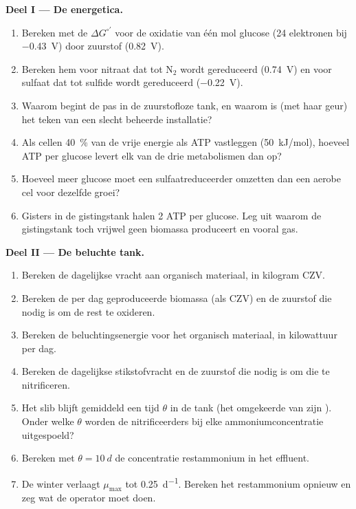 \begin{problem}
\medskip
\noindent\textbf{Deel I --- De energetica.}
\begin{enumerate}
  \item Bereken met de  $\Delta G^{\circ\prime}$
        voor de oxidatie van één mol glucose (24 elektronen bij
        \qty{-0.43}{V}) door zuurstof (\qty{+0.82}{V}).
  \item Bereken hem voor nitraat dat tot $\mathrm{N_2}$ wordt gereduceerd
        (\qty{+0.74}{V}) en voor sulfaat dat tot sulfide wordt gereduceerd
        (\qty{-0.22}{V}).
  \item Waarom begint de  pas in de zuurstofloze tank, en
        waarom is  (met haar geur) het teken van een
        slecht beheerde installatie?
  \item Als cellen \qty{40}{\%} van de vrije energie als ATP vastleggen
        (\qty{50}{kJ/mol}), hoeveel ATP per glucose levert elk van de
        drie metabolismen dan op?
  \item Hoeveel meer glucose moet een sulfaatreduceerder omzetten dan
        een aerobe cel voor dezelfde groei?
  \item Gisters in de gistingstank halen 2 ATP per glucose. Leg uit
        waarom de gistingstank toch vrijwel geen biomassa produceert en
        vooral gas.
\end{enumerate}

\medskip
\noindent\textbf{Deel II --- De beluchte tank.}
\begin{enumerate}[resume]
  \item Bereken de dagelijkse vracht aan organisch materiaal, in
        kilogram CZV.
  \item Bereken de per dag geproduceerde biomassa (als CZV) en de
        zuurstof die nodig is om de rest te oxideren.
  \item Bereken de beluchtingsenergie voor het organisch materiaal, in
        kilowattuur per dag.
  \item Bereken de dagelijkse stikstofvracht en de zuurstof die nodig is
        om die te nitrificeren.
  \item Het slib blijft gemiddeld een tijd $\theta$ in de tank (het
        omgekeerde van zijn ). Onder welke $\theta$
        worden de nitrificeerders bij elke ammoniumconcentratie uitgespoeld?
  \item Bereken met $\theta = \qty{10}{d}$ de concentratie restammonium
        in het effluent.
  \item De winter verlaagt $\mu_{\max}$ tot \qty{0.25}{d^{-1}}. Bereken
        het restammonium opnieuw en zeg wat de operator moet doen.
\end{enumerate}


\end{problem}

